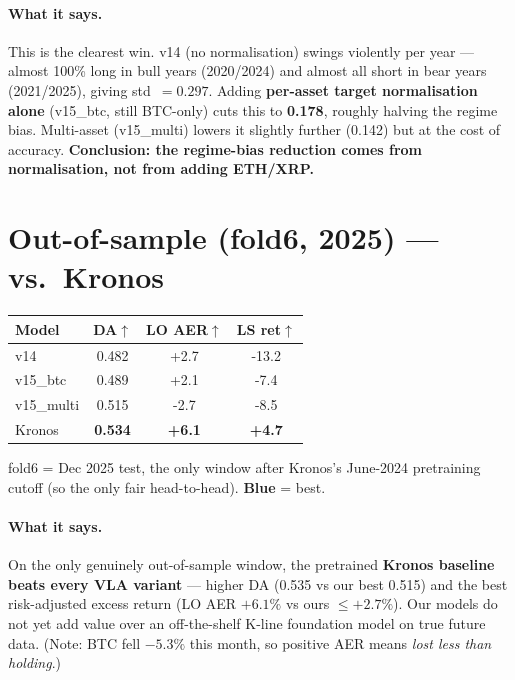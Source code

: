 \documentclass[11pt]{article}
\newcommand{\bb}[1]{\textcolor{best}{\textbf{#1}}}
\begin{document}
\paragraph{What it says.} This is the clearest win. v14 (no normalisation) swings violently per year --- almost 100\% long in bull years (2020/2024) and almost all short in bear years (2021/2025), giving std~$=0.297$. Adding \textbf{per-asset target normalisation alone} (v15\_btc, still BTC-only) cuts this to \textbf{0.178}, roughly halving the regime bias. Multi-asset (v15\_multi) lowers it slightly further (0.142) but at the cost of accuracy. \textbf{Conclusion: the regime-bias reduction comes from normalisation, not from adding ETH/XRP.}
\section*{Out-of-sample (fold6, 2025) --- vs.\ Kronos}
\begin{table}[h]\centering
\begin{tabular}{lccc}
\toprule
\textbf{Model} & \textbf{DA}$\uparrow$ & \textbf{LO AER}$\uparrow$ & \textbf{LS ret}$\uparrow$ \\
\midrule
v14 & 0.482 & +2.7 & -13.2 \\
v15\_btc & 0.489 & +2.1 & -7.4 \\
v15\_multi & 0.515 & -2.7 & -8.5 \\
Kronos & \bb{0.534} & \bb{+6.1} & \bb{+4.7} \\
\bottomrule\end{tabular}
\par\smallskip\footnotesize fold6 = Dec 2025 test, the only window after Kronos's June-2024 pretraining cutoff (so the only fair head-to-head). \bb{Blue} = best.
\end{table}
\paragraph{What it says.} On the only genuinely out-of-sample window, the pretrained \textbf{Kronos baseline beats every VLA variant} --- higher DA (0.535 vs our best 0.515) and the best risk-adjusted excess return (LO AER $+6.1\%$ vs ours $\le +2.7\%$). Our models do not yet add value over an off-the-shelf K-line foundation model on true future data. (Note: BTC fell $-5.3\%$ this month, so positive AER means \emph{lost less than holding}.)
\end{document}
